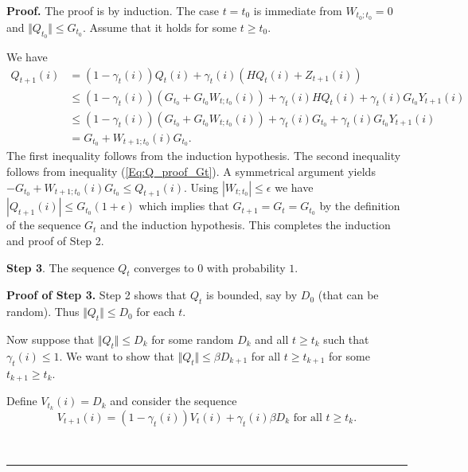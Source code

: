 \documentclass[letter,11pt]{article}
\newenvironment {proof}[1][Proof]{\noindent \textbf {#1.} }{\ \rule {0.5em}{0.5em}}
\begin{document}
\begin{proof}
The proof is by induction. The case $t=t_{0}$ is immediate from $W_{t_{0} ; t_{0} } =0$ and $\Vert Q_{t_{0} } \Vert   \leq  G_{t_{0}}$. Assume that it holds for some $t \geq t_{0}$. 

We have 
\begin{align*}
    Q_{t+1}(i) & = (1- \gamma_{t}(i) )Q_{t}(i) + \gamma_{t}(i) (HQ_{t}(i) + Z_{t+1} (i) ) \\
   & \leq (1- \gamma_{t}(i) ) ( G_{t_{0}} + G_{t_{0}}W_{t;t_{0} }(i) ) + \gamma_{t}(i) HQ_{t}(i) +  \gamma_{t}(i) G_{t_{0}} Y_{t+1} (i) \\
   & \leq (1- \gamma_{t}(i) )  ( G_{t_{0}} + G_{t_{0}}W_{t;t_{0} }(i) ) +  \gamma_{t}(i)G_{t_{0}}  + \gamma_{t}(i) G_{t_{0}} Y_{t+1} (i) \\
   & = G_{t_{0}} +W_{t+1;t_{0} }(i) G_{t_{0}}.  
\end{align*}
The first inequality follows from the induction hypothesis. The second inequality follows from inequality (\ref{Eq:Q_proof_Gt}). A symmetrical argument yields $-G_{t_{0}} +W_{t+1;t_{0} }(i) G_{t_{0}} \leq Q_{t+1}(i)$. Using $|W_{t;t_{0} } | \leq \epsilon$ we have $|Q_{t+1}(i)| \leq G_{t_{0}} (1+\epsilon)$ which implies that $G_{t+1}=G_{t} = G_{t_{0}}$ by the definition of the sequence $G_{t}$ and the induction hypothesis. This completes the induction and proof of Step 2.



\textbf{Step 3}. The sequence $Q_{t}$ converges to $0$ with probability $1$. 

\textbf{Proof of Step 3.} Step 2 shows that $Q_{t}$ is bounded, say by $D_{0}$ (that can be random). Thus $\Vert Q_{t} \Vert \leq D_{0}$ for each $t$. 

Now suppose that $\Vert Q_{t} \Vert \leq D_{k} $ for some random $D_{k}$ and all $t \geq t_{k}$ such that $\gamma_{t}(i) \leq 1$. We want to show that $\Vert Q_{t} \Vert \leq \beta D_{k+1} $ for all $t \geq t_{k+1} $ for some $t_{k+1} \geq t_{k}$.  

Define $V_{t_{k}} (i) = D_{k} $ and consider the sequence 
$$V_{t+1}(i) = (1-\gamma_{t}(i)) V_{t}(i) + \gamma_{t} (i) \beta D_{k} \text{ for all } t\geq t_{k}. $$



\end{proof}
\end{document}
